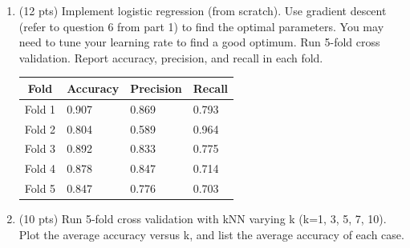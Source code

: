 \documentclass[a4paper]{article}
\theoremstyle{definition}
\newenvironment{soln}{
    \leavevmode\color{blue}\ignorespaces
}{}
\begin{document}
\begin{enumerate}
	\item (12 pts) Implement logistic regression (from scratch). Use gradient descent (refer to question 6 from part 1) to find the optimal parameters. You may need to tune your learning rate to find a good optimum. Run 5-fold cross validation. Report accuracy, precision, and recall in each fold.
	
	\begin{soln}
	
		\begin{table}[H]
			\centering
			\begin{tabular}{|l|l|l|l|}
			\hline
			\multicolumn{1}{|c|}{\textbf{Fold}} & \multicolumn{1}{c|}{\textbf{Accuracy}} & \multicolumn{1}{c|}{\textbf{Precision}} & \multicolumn{1}{c|}{\textbf{Recall}} \\ \hline
			Fold 1                              & 0.907                                  & 0.869                                   & 0.793                                \\ \hline
			Fold 2                              & 0.804                                  & 0.589                                   & 0.964                                \\ \hline
			Fold 3                              & 0.892                                  & 0.833                                   & 0.775                                \\ \hline
			Fold 4                              & 0.878                                  & 0.847                                   & 0.714                                \\ \hline
			Fold 5                              & 0.847                                  & 0.776                                   & 0.703                                \\ \hline
			\end{tabular}
			\end{table}
	\end{soln}
	
	\item (10 pts) Run 5-fold cross validation with kNN varying k (k=1, 3, 5, 7, 10). Plot the average accuracy versus k, and list the average accuracy of each case.


	\begin{soln}
		

\end{soln}
\end{enumerate}
\end{document}
